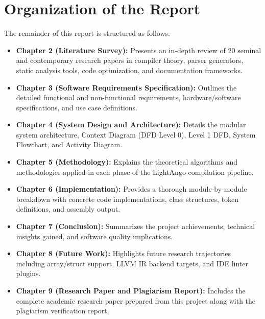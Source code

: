 \section{Organization of the Report}
The remainder of this report is structured as follows:
\begin{itemize}
    \item \textbf{Chapter 2 (Literature Survey):} Presents an in-depth review of 20 seminal and contemporary research papers in compiler theory, parser generators, static analysis tools, code optimization, and documentation frameworks.
    \item \textbf{Chapter 3 (Software Requirements Specification):} Outlines the detailed functional and non-functional requirements, hardware/software specifications, and use case definitions.
    \item \textbf{Chapter 4 (System Design and Architecture):} Details the modular system architecture, Context Diagram (DFD Level 0), Level 1 DFD, System Flowchart, and Activity Diagram.
    \item \textbf{Chapter 5 (Methodology):} Explains the theoretical algorithms and methodologies applied in each phase of the LightAngo compilation pipeline.
    \item \textbf{Chapter 6 (Implementation):} Provides a thorough module-by-module breakdown with concrete code implementations, class structures, token definitions, and assembly output.
    \item \textbf{Chapter 7 (Conclusion):} Summarizes the project achievements, technical insights gained, and software quality implications.
    \item \textbf{Chapter 8 (Future Work):} Highlights future research trajectories including array/struct support, LLVM IR backend targets, and IDE linter plugins.
    \item \textbf{Chapter 9 (Research Paper and Plagiarism Report):} Includes the complete academic research paper prepared from this project along with the plagiarism verification report.
\end{itemize}
\newpage
